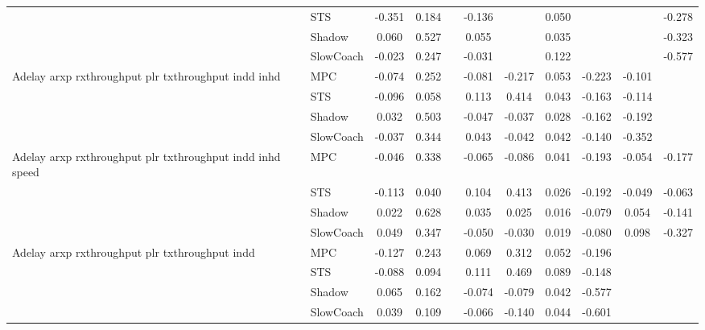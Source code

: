 \begin{tabular}{|l|l|*{9}{c|}}
                              & STS &   -0.351 &     0.184 &        & -0.136 &     &  0.050 &      &      &   -0.278 \\
                              & Shadow &    0.060 &     0.527 &        &  0.055 &     &  0.035 &      &      &   -0.323 \\
                              & SlowCoach &   -0.023 &     0.247 &        & -0.031 &     &  0.122 &      &      &   -0.577 \\
\midrule
Adelay arxp rxthroughput plr txthroughput indd inhd    & MPC &   -0.074 &     0.252 &        & -0.081 & -0.217 &  0.053 &  -0.223 &  -0.101 &       \\
                              & STS &   -0.096 &     0.058 &        &  0.113 &  0.414 &  0.043 &  -0.163 &  -0.114 &       \\
                              & Shadow &    0.032 &     0.503 &        & -0.047 & -0.037 &  0.028 &  -0.162 &  -0.192 &       \\
                              & SlowCoach &   -0.037 &     0.344 &        &  0.043 & -0.042 &  0.042 &  -0.140 &  -0.352 &       \\
\midrule
Adelay arxp rxthroughput plr txthroughput indd inhd speed    & MPC &   -0.046 &     0.338 &        & -0.065 & -0.086 &  0.041 &  -0.193 &  -0.054 &   -0.177 \\
                              & STS &   -0.113 &     0.040 &        &  0.104 &  0.413 &  0.026 &  -0.192 &  -0.049 &   -0.063 \\
                              & Shadow &    0.022 &     0.628 &        &  0.035 &  0.025 &  0.016 &  -0.079 &   0.054 &   -0.141 \\
                              & SlowCoach &    0.049 &     0.347 &        & -0.050 & -0.030 &  0.019 &  -0.080 &   0.098 &   -0.327 \\
\midrule
Adelay arxp rxthroughput plr txthroughput indd    & MPC &   -0.127 &     0.243 &        &  0.069 &  0.312 &  0.052 &  -0.196 &      &       \\
                              & STS &   -0.088 &     0.094 &        &  0.111 &  0.469 &  0.089 &  -0.148 &      &       \\
                              & Shadow &    0.065 &     0.162 &        & -0.074 & -0.079 &  0.042 &  -0.577 &      &       \\
                              & SlowCoach &    0.039 &     0.109 &        & -0.066 & -0.140 &  0.044 &  -0.601 &      &       \\

\end{tabular}
